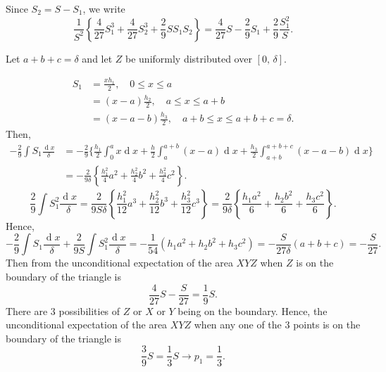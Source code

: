 \documentclass{article}
\DeclareMathOperator{\dif}{d}
\begin{document}
Since $S_{2} = S - S_{1}$, we write
\begin{equation*}
    \frac{1}{S^{2}}\left\{\frac{4}{27}S_{1}^{3} + \frac{4}{27}S_{2}^{3} + \frac{2}{9}SS_{1}S_{2}\right\} = \frac{4}{27}S - \frac{2}{9}S_{1} + \frac{2}{9}\frac{S_{1}^{2}}{S}.
\end{equation*}

Let $a + b + c = \delta$ and let $Z$ be uniformly distributed over $[0,\,\delta]$.

\begin{equation*}
    \begin{split}
        S_{1} &= \frac{xh_{1}}{2},\quad 0 \leqslant x \leqslant a 
        \\
        &= (x - a)\frac{h_{2}}{2},\quad a \leqslant x \leqslant a + b
        \\
        &= (x - a - b)\frac{h_{3}}{2},\quad a + b \leqslant x \leqslant a + b + c = \delta.
    \end{split}
\end{equation*}
Then,
\begin{equation*}
    \begin{split}
        -\frac{2}{9}\int S_{1}\frac{\dif x}{\delta} &= -\frac{2}{9}\Bigg\{\frac{h_{1}}{2}\int_{0}^{a}x\dif x + \frac{h}{2}\int_{a}^{a + b}(x - a)\dif x + \frac{h_{3}}{2}\int_{a + b}^{a + b + c}(x - a - b)\dif x\Bigg\}
        \\
        &= -\frac{2}{9\delta}\left\{\frac{h_{1}^{2}}{4}a^{2} + \frac{h_{2}^{2}}{4}b^{2} + \frac{h_{3}^{2}}{4}c^{2}\right\}.
    \end{split}
\end{equation*}
\begin{equation*}
    \frac{2}{9}\int S_{1}^{2}\frac{\dif x}{\delta} = \frac{2}{9S\delta}\left\{\frac{h_{1}^{2}}{12}a^{3} + \frac{h_{2}^{2}}{12}b^{3} + \frac{h_{3}^{2}}{12}c^{3}\right\} = \frac{2}{9\delta}\left\{\frac{h_{1}a^{2}}{6} + \frac{h_{2}b^{2}}{6} + \frac{h_{3}c^{2}}{6}\right\}.
\end{equation*}
Hence,
\begin{equation*}
    -\frac{2}{9}\int S_{1}\frac{\dif x}{\delta} + \frac{2}{9S}\int S_{1}^{2}\frac{\dif x}{\delta} = -\frac{1}{54}(h_{1}a^{2} + h_{2}b^{2} + h_{3}c^{2}) = -\frac{S}{27\delta}(a + b + c) = -\frac{S}{27}.
\end{equation*}
Then from the unconditional expectation of the area $XYZ$ when $Z$ is on the boundary of the triangle is
\begin{equation*}
    \frac{4}{27}S - \frac{S}{27} = \frac{1}{9}S.
\end{equation*}
There are $3$ possibilities of $Z$ or $X$ or $Y$ being on the boundary.
Hence, the unconditional expectation of the area $XYZ$ when any one of the $3$ points is on the boundary of the triangle is
\begin{equation*}
    \frac{3}{9}S = \frac{1}{3}S \rightarrow p_{1} = \frac{1}{3}.
\end{equation*}
\end{document}
